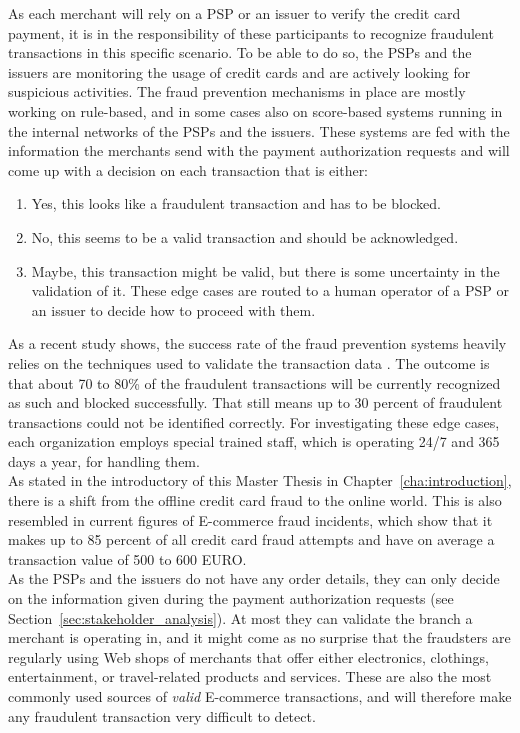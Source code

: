 As each merchant will rely on a \gls{PSP} or an issuer to verify the credit card payment, it is in the responsibility of these participants to recognize fraudulent transactions in this specific scenario. To be able to do so, the \gls{PSP}s and the issuers are monitoring the usage of credit cards and are actively looking for suspicious activities. The fraud prevention mechanisms in place are mostly working on rule-based, and in some cases also on score-based systems running in the internal networks of the \gls{PSP}s and the issuers. These systems are fed with the information the merchants send with the payment authorization requests and will come up with a decision on each transaction that is either:\@

\begin{enumerate}
  \item Yes, this looks like a fraudulent transaction and has to be blocked.
  \item No, this seems to be a valid transaction and should be acknowledged.
  \item Maybe, this transaction might be valid, but there is some uncertainty in the validation of it. These edge cases are routed to a human operator of a \gls{PSP} or an issuer to decide how to proceed with them.
\end{enumerate}

As a recent study shows, the success rate of the fraud prevention systems heavily relies on the techniques used to validate the transaction data \citep{rana2015survey}. The outcome is that about 70 to 80\% of the fraudulent transactions will be currently recognized as such and blocked successfully. That still means up to 30 percent of fraudulent transactions could not be identified correctly. For investigating these edge cases, each organization employs special trained staff, which is operating 24/7 and 365 days a year, for handling them. \\

As stated in the introductory of this Master Thesis in Chapter~\ref{cha:introduction}, there is a shift from the offline credit card fraud to the online world. This is also resembled in current figures of \gls{E-commerce} fraud incidents, which show that it makes up to 85 percent of all credit card fraud attempts and have on average a transaction value of 500 to 600 EURO.\\

As the \gls{PSP}s and the issuers do not have any order details, they can only decide on the information given during the payment authorization requests (see Section~\ref{sec:stakeholder_analysis}). At most they can validate the branch a merchant is operating in, and it might come as no surprise that the fraudsters are regularly using Web shops of merchants that offer either electronics, clothings, entertainment, or travel-related products and services. These are also the most commonly used sources of \emph{valid} \gls{E-commerce} transactions, and will therefore make any fraudulent transaction very difficult to detect. \\


